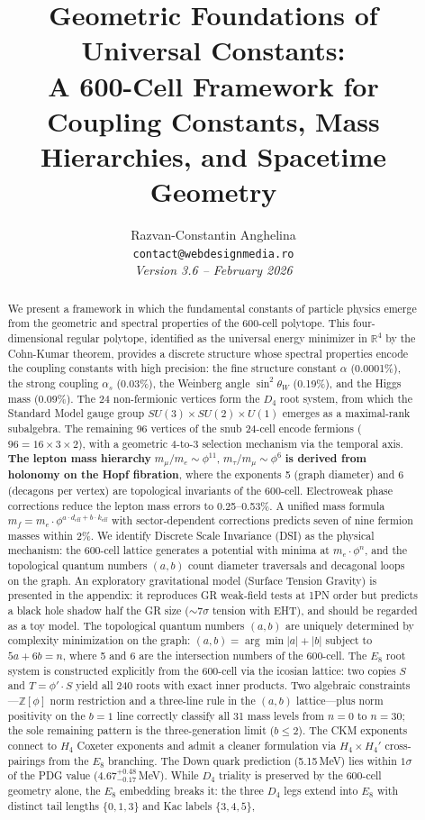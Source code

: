 \documentclass[12pt,a4paper]{article}
\title{\textbf{Geometric Foundations of Universal Constants:\\
A 600-Cell Framework for Coupling Constants, Mass Hierarchies, and Spacetime Geometry}}
\author{
Razvan-Constantin Anghelina\\
\texttt{contact@webdesignmedia.ro}\\[1em]
\textit{Version 3.6 -- February 2026}
}
\date{}
\begin{document}
\maketitle

\begin{abstract}
We present a framework in which the fundamental constants of particle physics emerge from the geometric and spectral properties of the 600-cell polytope. This four-dimensional regular polytope, identified as the universal energy minimizer in $\mathbb{R}^4$ by the Cohn-Kumar theorem, provides a discrete structure whose spectral properties encode the coupling constants with high precision: the fine structure constant $\alpha$ (0.0001\%), the strong coupling $\alpha_s$ (0.03\%), the Weinberg angle $\sin^2\theta_W$ (0.19\%), and the Higgs mass (0.09\%). The 24 non-fermionic vertices form the $D_4$ root system, from which the Standard Model gauge group $SU(3) \times SU(2) \times U(1)$ emerges as a maximal-rank subalgebra. The remaining 96 vertices of the snub 24-cell encode fermions ($96 = 16 \times 3 \times 2$), with a geometric 4-to-3 selection mechanism via the temporal axis. \textbf{The lepton mass hierarchy} $m_\mu/m_e \sim \phi^{11}$, $m_\tau/m_\mu \sim \phi^{6}$ \textbf{is derived from holonomy on the Hopf fibration}, where the exponents 5 (graph diameter) and 6 (decagons per vertex) are topological invariants of the 600-cell. Electroweak phase corrections reduce the lepton mass errors to 0.25--0.53\%. A unified mass formula $m_f = m_e \cdot \phi^{a \cdot d_{\text{eff}} + b \cdot k_{\text{eff}}}$ with sector-dependent corrections predicts seven of nine fermion masses within 2\%. We identify Discrete Scale Invariance (DSI) as the physical mechanism: the 600-cell lattice generates a potential with minima at $m_e \cdot \phi^n$, and the topological quantum numbers $(a,b)$ count diameter traversals and decagonal loops on the graph. An exploratory gravitational model (Surface Tension Gravity) is presented in the appendix: it reproduces GR weak-field tests at 1PN order but predicts a black hole shadow half the GR size ($\sim 7\sigma$ tension with EHT), and should be regarded as a toy model. The topological quantum numbers $(a,b)$ are uniquely determined by complexity minimization on the graph: $(a,b) = \arg\min|a|+|b|$ subject to $5a + 6b = n$, where 5 and 6 are the intersection numbers of the 600-cell. The $E_8$ root system is constructed explicitly from the 600-cell via the icosian lattice: two copies $S$ and $T = \phi' \cdot S$ yield all 240 roots with exact inner products. Two algebraic constraints---$\mathbb{Z}[\phi]$ norm restriction and a three-line rule in the $(a,b)$ lattice---plus norm positivity on the $b=1$ line correctly classify all 31 mass levels from $n=0$ to $n=30$; the sole remaining pattern is the three-generation limit ($b \leq 2$). The CKM exponents connect to $H_4$ Coxeter exponents and admit a cleaner formulation via $H_4 \times H_4'$ cross-pairings from the $E_8$ branching. The Down quark prediction (5.15\,MeV) lies within $1\sigma$ of the PDG value ($4.67^{+0.48}_{-0.17}$\,MeV). While $D_4$ triality is preserved by the 600-cell geometry alone, the $E_8$ embedding breaks it: the three $D_4$ legs extend into $E_8$ with distinct tail lengths $\{0, 1, 3\}$ and Kac labels $\{3, 4, 5\}$, 
\end{abstract}
\end{document}
